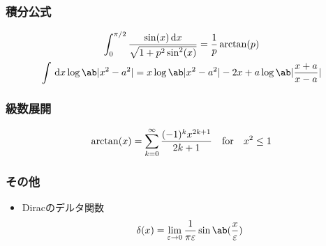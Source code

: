 \subsubsection{積分公式}
\begin{gather}%
  \label{eq:3.676}
  \int_0^{\pi/2} \frac{\sin(x) \dl{x}}{\sqrt{1+p^2\sin^2(x)}} 
  = \frac{1}{p}\arctan(p)\\
  \label{eq:2.736}
  \int \dl{x} \log \ab|x^2 - a^2|  = x \log\ab|x^2-a^2| - 2x + a \log \ab|\frac{x+a}{x-a}|
\end{gather}

\subsubsection{級数展開}
\begin{gather}%
  \label{eq:1.643}
  \arctan(x) = \sum_{k=0}^\infty \frac{(-1)^k x^{2k+1}}{2k+1} \qqtext{for} x^2 \leq 1
\end{gather}%

\subsubsection{その他}
\begin{itemize}%
  \item Diracのデルタ関数
    \begin{gather}%
      \delta(x) = \lim_{\eps \to 0} \frac{1}{\pi \eps}\sin\ab(\frac{x}{\eps})
    \end{gather}%
\end{itemize}%
